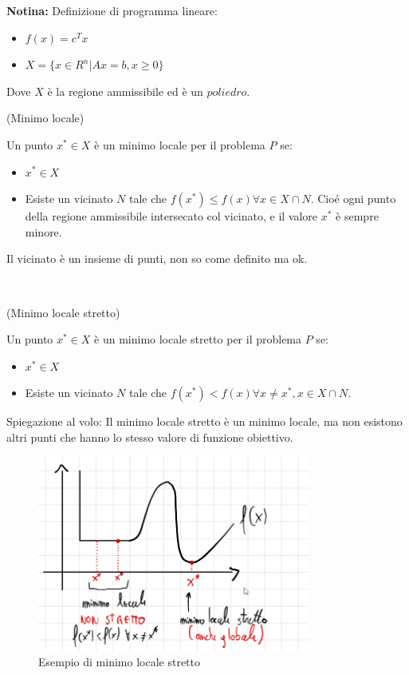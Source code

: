 \textbf{Notina:} Definizione di programma lineare:

\begin{itemize}
    \item $f(x) = c^T x$
    \item $X = \{x \in R^n | Ax = b, x \geq 0\}$
\end{itemize}
Dove $X$ è la regione ammissibile ed è un $poliedro$.

\begin{definition}
    (Minimo locale)

    Un punto $x^* \in X$ è un minimo locale per il problema $P$ se:
    \begin{itemize}
        \item $x^* \in X$
        \item Esiste un vicinato $N$ tale che $f(x^*) \leq f(x) \forall x \in X \cap N$. Cioé
              ogni punto della regione ammissibile intersecato col vicinato, e il valore
              $x^*$ è sempre minore.
    \end{itemize}
\end{definition}

Il vicinato è un insieme di punti, non so come definito ma ok.

\

\begin{definition}
    (Minimo locale stretto)

    Un punto $x^* \in X$ è un minimo locale stretto per il problema $P$ se:
    \begin{itemize}
        \item $x^* \in X$
        \item Esiste un vicinato $N$ tale che $f(x^*) < f(x) \forall x \neq x^*, x \in X \cap
                  N$.
    \end{itemize}
    Spiegazione al volo: Il minimo locale stretto è un minimo locale, ma non esistono altri punti che hanno lo stesso valore di funzione obiettivo.

    \begin{figure}[H]
        \centering
        \includegraphics[width=0.8\textwidth]{images/minimo locale.png}
        \caption{Esempio di minimo locale stretto}
        \label{fig:esempio-di-minimo-locale-stretto}
    \end{figure}
\end{definition}

